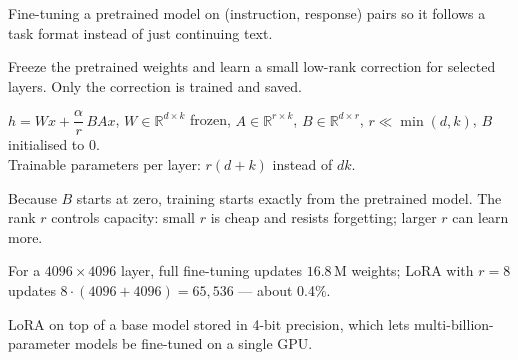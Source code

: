 \documentclass[11pt,a4paper]{article}
\begin{document}

\begin{bdef}
Fine-tuning a pretrained model on (instruction, response) pairs so it follows a task format instead of just continuing text.
\end{bdef}
\begin{bdef}
Freeze the pretrained weights and learn a small low-rank correction for selected layers. Only the correction is trained and saved.
\end{bdef}
\begin{bmath}
$h=Wx+\dfrac{\alpha}{r}\,BAx$, \;$W\in\mathbb{R}^{d\times k}$ frozen, $A\in\mathbb{R}^{r\times k}$, $B\in\mathbb{R}^{d\times r}$, $r\ll\min(d,k)$, $B$ initialised to 0.\\[3pt]
Trainable parameters per layer: $r(d+k)$ instead of $dk$.
\end{bmath}
Because $B$ starts at zero, training starts exactly from the pretrained model. The rank $r$ controls capacity: small $r$ is cheap and resists forgetting; larger $r$ can learn more.
\begin{bex}
For a $4096\times4096$ layer, full fine-tuning updates $16.8$\,M weights; LoRA with $r=8$ updates $8\cdot(4096+4096)=65{,}536$ --- about 0.4\%.
\end{bex}
\begin{bdef}[QLoRA]
LoRA on top of a base model stored in 4-bit precision, which lets multi-billion-parameter models be fine-tuned on a single GPU.
\end{bdef}
\end{document}
